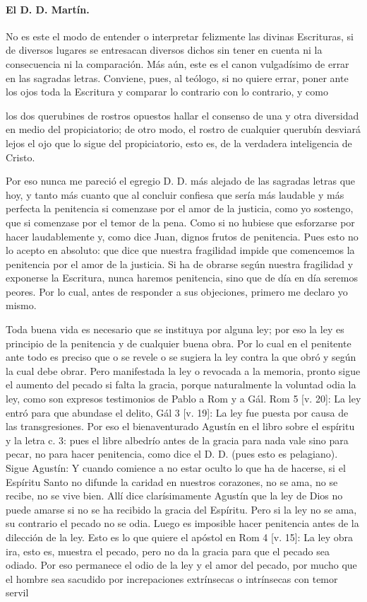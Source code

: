 \paragraph*{El D. D. Martín.}

No es este el modo de entender o interpretar felizmente las divinas Escrituras, si de diversos lugares se entresacan diversos dichos sin tener en cuenta ni la consecuencia ni la comparación. Más aún, este es el canon vulgadísimo de errar en las sagradas letras. Conviene, pues, al teólogo, si no quiere errar, poner ante los ojos toda la Escritura y comparar lo contrario con lo contrario, y como

los dos querubines de rostros opuestos hallar el consenso de una y otra diversidad en medio del propiciatorio; de otro modo, el rostro de cualquier querubín desviará lejos el ojo que lo sigue del propiciatorio, esto es, de la verdadera inteligencia de Cristo.

Por eso nunca me pareció el egregio D. D. más alejado de las sagradas letras que hoy, y tanto más cuanto que al concluir confiesa que sería más laudable y más perfecta la penitencia si comenzase por el amor de la justicia, como yo sostengo, que si comenzase por el temor de la pena. Como si no hubiese que esforzarse por hacer laudablemente y, como dice Juan, dignos frutos de penitencia. Pues esto no lo acepto en absoluto: que dice que nuestra fragilidad impide que comencemos la penitencia por el amor de la justicia. Si ha de obrarse según nuestra fragilidad y exponerse la Escritura, nunca haremos penitencia, sino que de día en día seremos peores. Por lo cual, antes de responder a sus objeciones, primero me declaro yo mismo.

Toda buena vida es necesario que se instituya por alguna ley; por eso la ley es principio de la penitencia y de cualquier buena obra. Por lo cual en el penitente ante todo es preciso que o se revele o se sugiera la ley contra la que obró y según la cual debe obrar. Pero manifestada la ley o revocada a la memoria, pronto sigue el aumento del pecado si falta la gracia, porque naturalmente la voluntad odia la ley, como son expresos testimonios de Pablo a Rom y a Gál. Rom 5 [v. 20]: La ley entró para que abundase el delito, Gál 3 [v. 19]: La ley \marginpar{\small[362]} fue puesta por causa de las transgresiones. Por eso el bienaventurado Agustín en el libro sobre el espíritu y la letra c. 3: pues el libre albedrío antes de la gracia para nada vale sino para pecar, no para hacer penitencia, como dice el D. D. (pues esto es pelagiano). Sigue Agustín: Y cuando comience a no estar oculto lo que ha de hacerse, si el Espíritu Santo no difunde la caridad en nuestros corazones, no se ama, no se recibe, no se vive bien. Allí dice clarísimamente Agustín que la ley de Dios no puede amarse si no se ha recibido la gracia del Espíritu. Pero si la ley no se ama, su contrario el pecado no se odia. Luego es imposible hacer penitencia antes de la dilección de la ley. Esto es lo que quiere el apóstol en Rom 4 [v. 15]: La ley obra ira, esto es, muestra el pecado, pero no da la gracia para que el pecado sea odiado. Por eso permanece el odio de la ley y el amor del pecado, por mucho que el hombre sea sacudido por increpaciones extrínsecas o intrínsecas con temor servil

